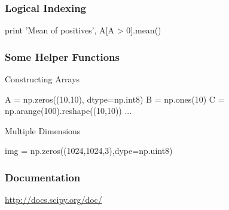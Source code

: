 \begin{frame}[fragile]
\frametitle{Logical Indexing}

\begin{python}
print 'Mean of positives', A[A > 0].mean()
\end{python}
\end{frame}

\begin{frame}[fragile]
\frametitle{Some Helper Functions}

\begin{block}{Constructing Arrays}
\begin{python}
A = np.zeros((10,10), dtype=np.int8)
B = np.ones(10)
C = np.arange(100).reshape((10,10))
...
\end{python}
\end{block}

\begin{block}{Multiple Dimensions}
\begin{python}
img = np.zeros((1024,1024,3),dype=np.uint8)
\end{python}
\end{block}

\end{frame}


\begin{frame}[fragile]
\frametitle{Documentation}

\href{http://docs.scipy.org/doc/}{http://docs.scipy.org/doc/}

\end{frame}



